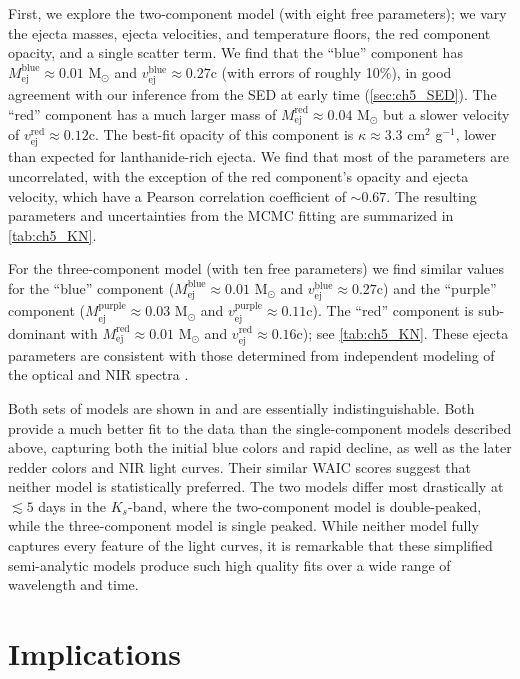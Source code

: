 First, we explore the two-component model (with eight free parameters); we vary the ejecta masses, ejecta velocities, and temperature floors, the red component opacity, and a single scatter term. We find that the ``blue'' component has $M_\mathrm{ej}^\mathrm{blue}\approx 0.01$ M$_\odot$ and $v_\mathrm{ej}^\mathrm{blue}\approx 0.27$c (with errors of roughly 10\%), in good agreement with our inference from the SED at early time (\cref{sec:ch5_SED}). The ``red'' component has a much larger mass of $M_\mathrm{ej}^\mathrm{red}\approx 0.04$ M$_\odot$ but a slower velocity of $v_\mathrm{ej}^\mathrm{red}\approx 0.12$c. The best-fit opacity of this component is $\kappa\approx 3.3$ cm$^{2}$ g$^{-1}$, lower than expected for lanthanide-rich ejecta. We find that most of the parameters are uncorrelated, with the exception of the red component's opacity and ejecta velocity, which have a Pearson correlation coefficient of $\sim0.67$. The resulting parameters and uncertainties from the MCMC fitting are summarized in \cref{tab:ch5_KN}.

\clearpage
For the three-component model (with ten free parameters) we find similar values for the ``blue'' component ($M_\mathrm{ej}^\mathrm{blue}\approx 0.01$ M$_\odot$ and $v_\mathrm{ej}^\mathrm{blue}\approx 0.27$c) and the ``purple'' component ($M_\mathrm{ej}^\mathrm{purple}\approx 0.03$ M$_\odot$ and $v_\mathrm{ej}^\mathrm{purple}\approx 0.11$c).  The ``red'' component is sub-dominant with $M_\mathrm{ej}^\mathrm{red}\approx 0.01$ M$_\odot$ and $v_\mathrm{ej}^\mathrm{red}\approx 0.16$c); see \cref{tab:ch5_KN}. These ejecta parameters are consistent with those determined from independent modeling of the optical and NIR spectra \citep{Chornock+17,Nicholl+17a}.

Both sets of models are shown in  and are essentially indistinguishable.  Both provide a much better fit to the data than the single-component models described above, capturing both the initial blue colors and rapid decline, as well as the later redder colors and NIR light curves.  Their similar WAIC scores suggest that neither model is statistically preferred. The two models differ most drastically at $\lesssim 5$ days in the $K_s$-band, where the two-component model is double-peaked, while the three-component model is single peaked. While neither model fully captures every feature of the light curves, it is remarkable that these simplified semi-analytic models produce such high quality fits over a wide range of wavelength and time.

\section{Implications}
\label{sec:ch5_interpretation}

